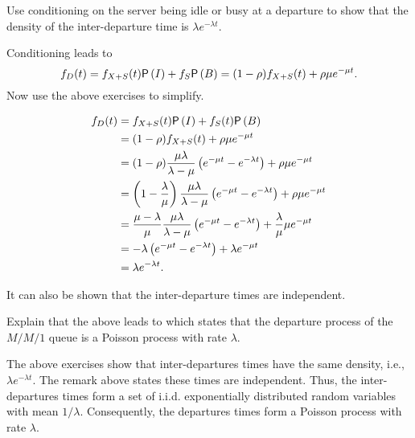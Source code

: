 \begin{exercise}
Use conditioning on the server being idle or busy at a departure to show that  the density of  the inter-departure time is $\lambda e^{-\lambda t}$.
  \begin{hint}
Conditioning leads to 
\begin{equation*}
    f_D(t) = f_{X+S}(t) \P{I} + f_S \P B = (1-\rho) f_{X+S}(t) +
    \rho \mu e^{-\mu t}.
\end{equation*}
    Now use the above exercises to simplify.
  \end{hint}
  \begin{solution}
       \begin{align*}
    f_D(t) 
&= f_{X+S}(t) \P I + f_S(t) \P B \\
&= (1-\rho) f_{X+S}(t) +    \rho \mu e^{-\mu t} \\
&= (1-\rho) \frac{\mu\lambda}{\lambda-\mu} \left(e^{-\mu t}-e^{-\lambda t}\right) +    \rho \mu e^{-\mu t} \\
&= \left(1-\frac{\lambda}\mu\right) \frac{\mu\lambda}{\lambda-\mu}\left(e^{-\mu t}-e^{-\lambda t}\right)  +    \rho \mu e^{-\mu t} \\
&= \frac{\mu-\lambda}\mu \frac{\mu\lambda}{\lambda-\mu}\left(e^{-\mu t}-e^{-\lambda t}\right)  +    \frac\lambda \mu \mu e^{-\mu t} \\
&= - \lambda\left(e^{-\mu t}-e^{-\lambda t}\right)  +    \lambda e^{-\mu t} \\
&=  \lambda e^{-\lambda t}.
      \end{align*}
  \end{solution}
\end{exercise}

It can also be shown that the inter-departure times are independent. 

\begin{exercise}\label{ex:burke}
Explain that the above leads to   which states that the departure process of the $M/M/1$ queue is a Poisson  process with rate $\lambda$. 
\begin{solution}
The above exercises show that inter-departures times have the same density, i.e., $\lambda e^{-\lambda t}$. The remark above states these times are independent. Thus,  the inter-departures times form a set of i.i.d. exponentially distributed random variables with mean $1/\lambda$. Consequently, the departures times form a Poisson process with rate $\lambda$.
\end{solution}
\end{exercise}







